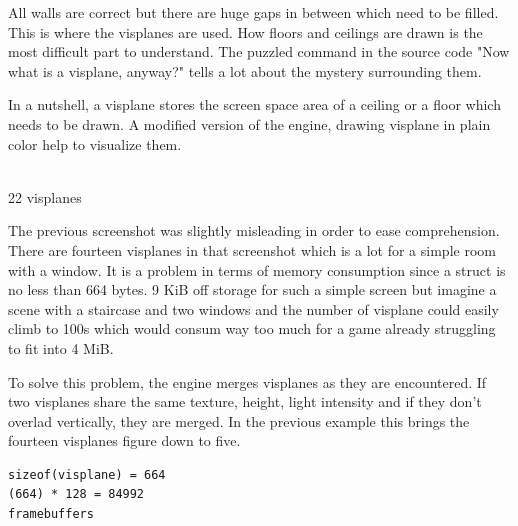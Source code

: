  All walls are correct but there are huge gaps in between which need to be filled. This is where the visplanes are used. How floors and ceilings are drawn is the most difficult part to understand. The puzzled command in the source code "Now what is a visplane, anyway?" tells a lot about the mystery surrounding them.\\
\par

In a nutshell, a visplane stores the screen space area of a ceiling or a floor which needs to be drawn. A modified version of the engine, drawing visplane in plain color help to visualize them.\\
\par
{}\\
 22 visplanes
\par
The previous screenshot was slightly misleading in order to ease comprehension. There are fourteen visplanes in that screenshot which is a lot for a simple room with a window. It is a problem in terms of memory consumption since a  struct is no less than 664 bytes. 9 KiB off storage for such a simple screen but imagine a scene with a staircase and two windows and the number of visplane could easily climb to 100s which would consum way too much for a game already struggling to fit into 4 MiB.\\
\par
To solve this problem, the engine merges visplanes as they are encountered. If two visplanes share the same texture, height, light intensity and if they don't overlad vertically, they are merged. In the previous example this brings the fourteen visplanes figure down to five.\\
\par
{}

\par
\begin{verbatim}
sizeof(visplane) = 664
(664) * 128 = 84992
framebuffers
\end{verbatim}




















